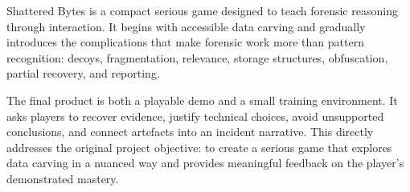 \documentclass[11pt,a4paper]{article}
\newcommand{\projecttitle}{Shattered Bytes}
\begin{document}
\projecttitle{} is a compact serious game designed to teach forensic reasoning through interaction. It begins with accessible data carving and gradually introduces the complications that make forensic work more than pattern recognition: decoys, fragmentation, relevance, storage structures, obfuscation, partial recovery, and reporting.

The final product is both a playable demo and a small training environment. It asks players to recover evidence, justify technical choices, avoid unsupported conclusions, and connect artefacts into an incident narrative. This directly addresses the original project objective: to create a serious game that explores data carving in a nuanced way and provides meaningful feedback on the player's demonstrated mastery.
\end{document}
